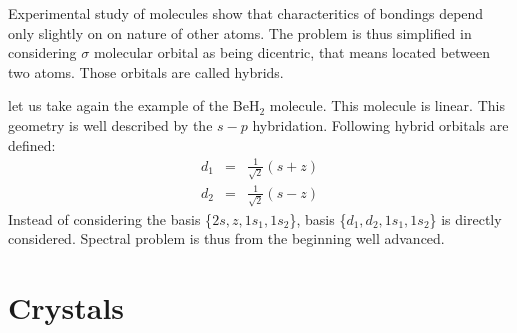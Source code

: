 \documentclass[12pt]{book}
\begin{document}
Experimental study of molecules show that characteritics of bondings depend
only slightly on on nature of other atoms. The
problem is thus simplified in considering $\sigma$ molecular orbital as being
dicentric, that means located between two atoms. Those orbitals are called
hybrids. 
\begin{exmp}
let us take again the example of the  BeH$_2$ molecule. This molecule is
linear. This geometry is well described by the $s-p$ hybridation. Following
hybrid orbitals are defined: 
\begin{eqnarray}
d_1&=&\frac{1}{\sqrt{2}}(s+z)\\
d_2&=&\frac{1}{\sqrt{2}}(s-z)
\end{eqnarray}
Instead of considering the basis \{$2s,z,1s_1,1s_2$\}, basis
\{$d_1,d_2,1s_1,1s_2$\} is directly considered. Spectral problem is thus from
the beginning well advanced.
\end{exmp}
\section{Crystals}\label{secsolidmq}
\end{document}
